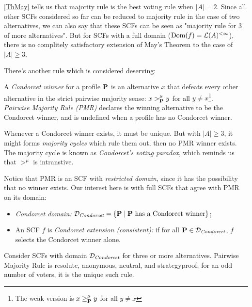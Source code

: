 \cref{ThMay} tells us that majority rule is the best voting rule when $|A| = 2$. Since all other SCFs considered so far can be reduced to majority rule in the case of two alternatives, we can also say that these SCFs can be seen as "majority rule for 3 of more alternatives". But for SCFs with a full domain ($\mathrm{Dom}(f) = \mathcal{L}(A)^{<\infty}$), there is no complitely satisfactory extension of May's Theorem to the case of $|A| \geq 3$.

There's another rule which is considered deserving:

\begin{definition}
    A \textit{Condorcet winner} for a profile $\mathbf{P}$ is an alternative $x$ that defeats every other alternative in the strict pairwise majority sense: $x >^\mu_{\mathbf{P}} y$ for all $y \neq x$\footnote{The weak version is $x \geq^\mu_{\mathbf{P}} y$ for all $y \neq x$}.\\
    \textit{Pairwise Majority Rule (PMR)} declares the winning alternative to be the Condorcet winner, and is undefined when a profile has no Condorcet winner.
\end{definition}

Whenever a Condorcet winner exists, it must be unique. But with $|A| \geq 3$, it might forms \textit{majority cycles} which rule them out, then no PMR winner exists. The majority cycle is known as \textit{Condorcet's voting paradox}, which reminds us that $>^\mu$ is intranstive.

Notice that PMR is an SCF with \textit{restricted domain}, since it has the possibility that no winner exists. Our interest here is with full SCFs that agree with PMR on its domain:

\begin{definition}
    \begin{itemize}
        \item \textit{Condorcet domain:} $\mathcal{D}_\textit{Condorcet} = \{\mathbf{P}\;|\; \mathbf{P} \mbox{ has a Condorcet winner}\}$;
        \item An SCF $f$ is \textit{Condorcet extension (consistent):} if for all $\mathbf{P} \in \mathcal{D}_\textit{Condorcet}$, $f$ selects the Condorcet winner alone.
    \end{itemize}
\end{definition}

\begin{proposition}
    \label{ThCK}
    Consider SCFs with domain $\mathcal{D}_\textit{Condorcet}$ for three or more alternatives. Pairwise Majority Rule is resolute, anonymous, neutral, and strategyproof; for an odd number of voters, it is the unique such rule.
\end{proposition}

